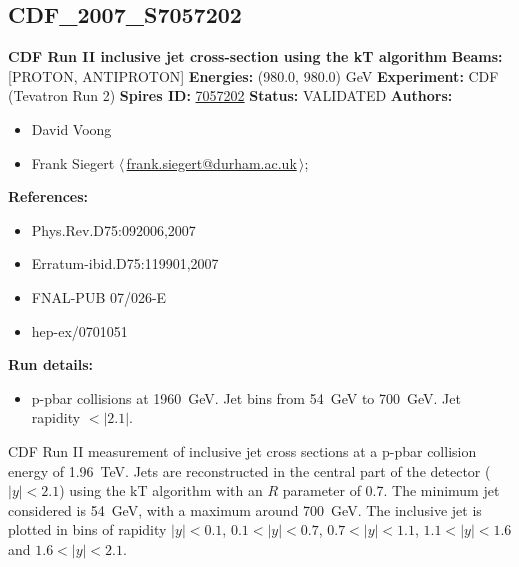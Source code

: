 \subsection[CDF\_2007\_S7057202]{CDF\_2007\_S7057202\,\cite{Abulencia:2007ez}}
\textbf{CDF Run II inclusive jet cross-section using the kT algorithm}\newline
\textbf{Beams:} [PROTON, ANTIPROTON] \newline
\textbf{Energies:} (980.0, 980.0) GeV \newline
\textbf{Experiment:} CDF (Tevatron Run 2) \newline
\textbf{Spires ID:} \href{http://www.slac.stanford.edu/spires/find/hep/www?rawcmd=key+7057202}{7057202}\newline
\textbf{Status:} VALIDATED\newline
\textbf{Authors:}
\begin{itemize}
  \item David Voong
  \item Frank Siegert $\langle\,$\href{mailto:frank.siegert@durham.ac.uk}{frank.siegert@durham.ac.uk}$\,\rangle$;
\end{itemize}
\textbf{References:}
\begin{itemize}
  \item Phys.Rev.D75:092006,2007
  \item Erratum-ibid.D75:119901,2007
  \item FNAL-PUB 07/026-E
  \item hep-ex/0701051
\end{itemize}
\textbf{Run details:}
\begin{itemize}

  \item p-pbar collisions at 1960~GeV. Jet \pT bins from 54~GeV to 700~GeV. Jet rapidity $< |2.1|$.\end{itemize}

\noindent CDF Run II measurement of inclusive jet cross sections at a p-pbar collision energy of 1.96~TeV. Jets are reconstructed in the central part of the detector ($|y|<2.1$) using the kT algorithm with an $R$ parameter of 0.7. The minimum jet \pT considered is 54~GeV, with a maximum around 700~GeV.  The inclusive jet \pT is plotted in bins of rapidity $|y|<0.1$, $0.1<|y|<0.7$, $0.7<|y|<1.1$, $1.1<|y|<1.6$ and $1.6<|y|<2.1$.

\clearpage


\clearpage

